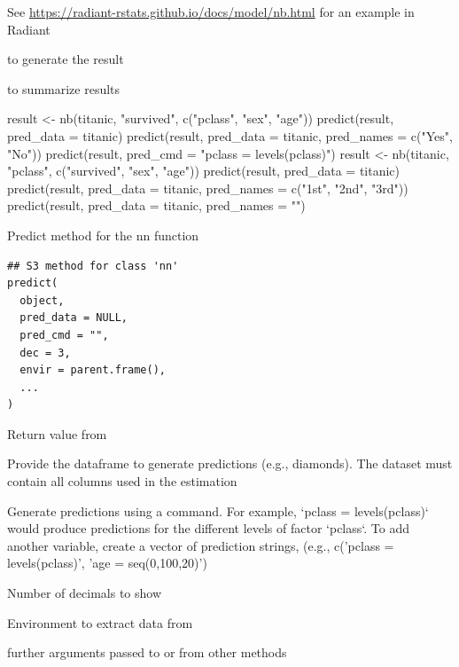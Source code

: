 \documentclass[a4paper]{book}
\begin{document}
%
\begin{Details}
See \url{https://radiant-rstats.github.io/docs/model/nb.html} for an example in Radiant
\end{Details}
%
\begin{SeeAlso}
 to generate the result

 to summarize results
\end{SeeAlso}
%
\begin{Examples}
\begin{ExampleCode}
result <- nb(titanic, "survived", c("pclass", "sex", "age"))
predict(result, pred_data = titanic)
predict(result, pred_data = titanic, pred_names = c("Yes", "No"))
predict(result, pred_cmd = "pclass = levels(pclass)")
result <- nb(titanic, "pclass", c("survived", "sex", "age"))
predict(result, pred_data = titanic)
predict(result, pred_data = titanic, pred_names = c("1st", "2nd", "3rd"))
predict(result, pred_data = titanic, pred_names = "")

\end{ExampleCode}
\end{Examples}
%
\begin{Description}
Predict method for the nn function
\end{Description}
%
\begin{Usage}
\begin{verbatim}
## S3 method for class 'nn'
predict(
  object,
  pred_data = NULL,
  pred_cmd = "",
  dec = 3,
  envir = parent.frame(),
  ...
)
\end{verbatim}
\end{Usage}
%
\begin{Arguments}
\begin{ldescription}
\item[\code{object}] Return value from 

\item[\code{pred\_data}] Provide the dataframe to generate predictions (e.g., diamonds). The dataset must contain all columns used in the estimation

\item[\code{pred\_cmd}] Generate predictions using a command. For example, `pclass = levels(pclass)` would produce predictions for the different levels of factor `pclass`. To add another variable, create a vector of prediction strings, (e.g., c('pclass = levels(pclass)', 'age = seq(0,100,20)')

\item[\code{dec}] Number of decimals to show

\item[\code{envir}] Environment to extract data from

\item[\code{...}] further arguments passed to or from other methods
\end{ldescription}
\end{Arguments}
\end{document}
